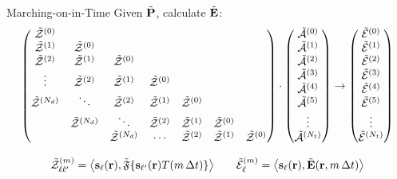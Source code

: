 \documentclass[aspectratio=169, usenames, dvipsnames]{beamer}
\begin{document}
\begin{frame}{Marching-on-in-Time}
  Given $\tilde{\vb{P}}$, calculate $\tilde{\vb{E}}$:
  \begin{equation*}
    \mqty(
      \tilde{\mathcal{Z}}^{(0)} \\
      \tilde{\mathcal{Z}}^{(1)}   & \tilde{\mathcal{Z}}^{(0)} \\
      \tilde{\mathcal{Z}}^{(2)}   & \tilde{\mathcal{Z}}^{(1)}    & \tilde{\mathcal{Z}}^{(0)} \\
      \vdots                      & \tilde{\mathcal{Z}}^{(2)}    & \tilde{\mathcal{Z}}^{(1)}    & \tilde{\mathcal{Z}}^{(0)} \\
      \tilde{\mathcal{Z}}^{(N_d)} & \ddots                       & \tilde{\mathcal{Z}}^{(2)}    & \tilde{\mathcal{Z}}^{(1)}    & \tilde{\mathcal{Z}}^{(0)} \\
                                  & \tilde{\mathcal{Z}}^{(N_d)}  & \ddots                       & \tilde{\mathcal{Z}}^{(2)}    & \tilde{\mathcal{Z}}^{(1)}    & \tilde{\mathcal{Z}}^{(0)} \\
                                  &                              & \tilde{\mathcal{Z}}^{(N_d)}  & \cdots                       & \tilde{\mathcal{Z}}^{(2)}    & \tilde{\mathcal{Z}}^{(1)}    & \tilde{\mathcal{Z}}^{(0)}
  ) \cdot
  \mqty(\tilde{\mathcal{A}}^{(0)} \\ \tilde{\mathcal{A}}^{(1)} \\ \tilde{\mathcal{A}}^{(2)} \\ \tilde{\mathcal{A}}^{(3)} \\ \tilde{\mathcal{A}}^{(4)} \\ \tilde{\mathcal{A}}^{(5)} \\ \vdots \\ \tilde{\mathcal{A}}^{(N_t)}) \rightarrow
  \mqty(\tilde{\mathcal{E}}^{(0)} \\ \tilde{\mathcal{E}}^{(1)} \\ \tilde{\mathcal{E}}^{(2)} \\ \tilde{\mathcal{E}}^{(3)} \\ \tilde{\mathcal{E}}^{(4)} \\ \tilde{\mathcal{E}}^{(5)} \\ \vdots \\ \tilde{\mathcal{E}}^{(N_t)})
  \end{equation*}

  \begin{equation*}
    \tilde{\mathcal{Z}}^\qty(m)_{\ell \ell'} = \big\langle \vb{s}_\ell(\vb{r}), \tilde{\mathfrak{F}}\qty{\vb{s}_{\ell'}(\vb{r}) T(m \, \Delta t)} \big\rangle  \qquad
    \tilde{\mathcal{E}}^\qty(m)_{\ell} = \big\langle \vb{s}_\ell(\vb{r}), \tilde{\vb{E}}(\vb{r}, m \, \Delta t) \big\rangle 
  \end{equation*}
\end{frame}
\end{document}
